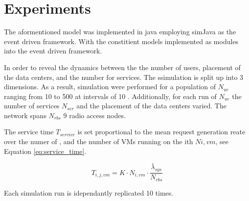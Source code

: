 \section{Experiments}
The aformentioned model was implemented in java employing simJava \cite{SimJava} as the event driven framework. With the constitient models implemented as modules into the event driven framework.

In order to reveal the dynamics between the the number of users, placement of the data centers, and the number for services. The ssimulation is split up into 3 dimensions. As a result, simulation were performed for a population of \ues $N_{ue}$ ranging from 10 to 500 \ues at intervals of 10 \ues. Additionally, for each run of $N_{ue}$ the number of services $N_{ser}$ and the placement of the data centers varied. The network spans $N_{rbs}$ 9 radio access nodes.

The \dc service time $T_{service}$ is set proportional to the mean request generation reate over the numer of  \rbss, and the number of VMs running on the ith \dc $N{i,vm}$, see Equation \ref{eq:service_time}.

\begin{equation}
\label{eq:service_time}
T_{i,j,vm} = K \cdot N_{i,vm} \cdot \frac{ \bar{\lambda}_{sys} }{N_{rbs}}
\end{equation}


Each simulation run is idependantly replicated 10 times.